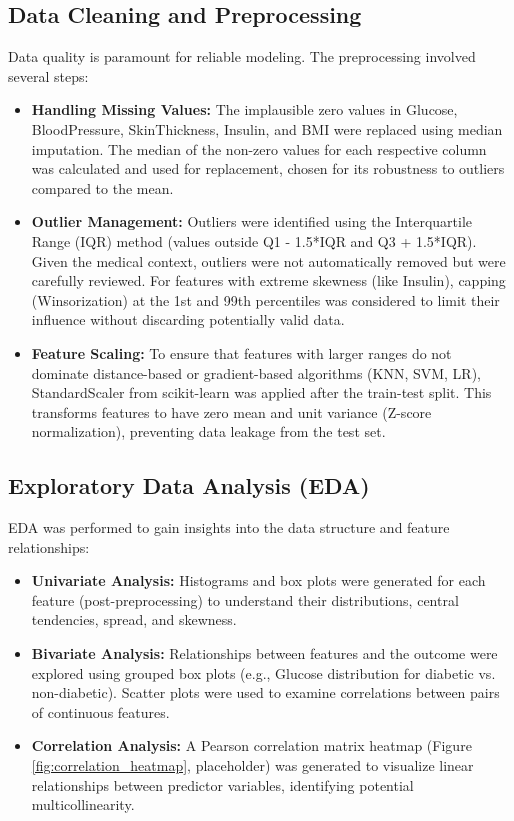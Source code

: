 \documentclass[conference]{IEEEtran}
\begin{document}
\subsection{Data Cleaning and Preprocessing}
Data quality is paramount for reliable modeling. The preprocessing involved several steps:
\begin{itemize}
    \item \textbf{Handling Missing Values:} The implausible zero values in Glucose, BloodPressure, SkinThickness, Insulin, and BMI were replaced using median imputation. The median of the non-zero values for each respective column was calculated and used for replacement, chosen for its robustness to outliers compared to the mean.
    \item \textbf{Outlier Management:} Outliers were identified using the Interquartile Range (IQR) method (values outside Q1 - 1.5*IQR and Q3 + 1.5*IQR). Given the medical context, outliers were not automatically removed but were carefully reviewed. For features with extreme skewness (like Insulin), capping (Winsorization) at the 1st and 99th percentiles was considered to limit their influence without discarding potentially valid data.
    \item \textbf{Feature Scaling:} To ensure that features with larger ranges do not dominate distance-based or gradient-based algorithms (KNN, SVM, LR), StandardScaler from scikit-learn was applied after the train-test split. This transforms features to have zero mean and unit variance (Z-score normalization), preventing data leakage from the test set.
\end{itemize}

\subsection{Exploratory Data Analysis (EDA)}
EDA was performed to gain insights into the data structure and feature relationships:
\begin{itemize}
    \item \textbf{Univariate Analysis:} Histograms and box plots were generated for each feature (post-preprocessing) to understand their distributions, central tendencies, spread, and skewness.
    \item \textbf{Bivariate Analysis:} Relationships between features and the outcome were explored using grouped box plots (e.g., Glucose distribution for diabetic vs. non-diabetic). Scatter plots were used to examine correlations between pairs of continuous features.
    \item \textbf{Correlation Analysis:} A Pearson correlation matrix heatmap (Figure \ref{fig:correlation_heatmap}, placeholder) was generated to visualize linear relationships between predictor variables, identifying potential multicollinearity.
\end{itemize}
\end{document}
